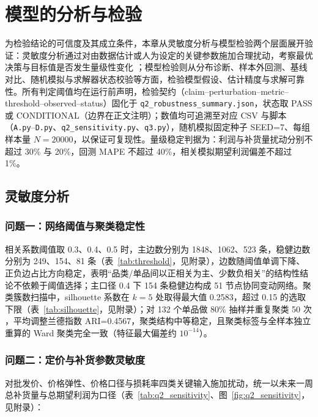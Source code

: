 \section{模型的分析与检验}

为检验结论的可信度及其成立条件，本章从灵敏度分析与模型检验两个层面展开验证：灵敏度分析通过对由数据估计或人为设定的关键参数施加合理扰动，考察最优决策与目标值是否发生量级性变化 \cite{saltelli2008}；模型检验则从分布诊断、样本外回测、基线对比、随机模拟与求解器状态校验等方面，检验模型假设、估计精度与求解可靠性。所有判定阈值均在运行前声明，检验契约（claim--perturbation--metric--threshold--observed--status）固化于 \texttt{q2\_robustness\_summary.json}，状态取 PASS 或 CONDITIONAL（边界在正文注明）；数值均可追溯至对应 CSV 与脚本（\texttt{A.py}--\texttt{D.py}、\texttt{q2\_sensitivity.py}、\texttt{q3.py}），随机模拟固定种子 SEED=7、每组样本量 $N=20000$，以保证可复现性。量级稳定判据为：利润与补货量扰动分别不超过 30\% 与 20\%，回测 MAPE 不超过 40\%，相关模拟期望利润偏差不超过 1\%。

\subsection{灵敏度分析}

\subsubsection{问题一：网络阈值与聚类稳定性}

相关系数阈值取 0.3、0.4、0.5 时，主边数分别为 1848、1062、523 条，稳健边数分别为 249、154、81 条（表~\ref{tab:threshold}，见附录），边数随阈值单调下降、正负边占比方向稳定，表明“品类/单品间以正相关为主、少数负相关”的结构性结论不依赖于阈值选择；主口径 0.4 下 154 条稳健边构成 51 节点协同变动网络。聚类簇数扫描中，silhouette 系数在 $k=5$ 处取得最大值 0.2583，超过 0.15 的选取下限（表~\ref{tab:silhouette}，见附录）；对 132 个单品做 80\% 抽样并重复聚类 50 次 \cite{efron1993}，平均调整兰德指数 ARI=0.4567，聚类结构中等稳定，且聚类标签与全样本独立重算的 Ward 聚类完全一致（特征最大偏差约 $10^{-14}$）。

\subsubsection{问题二：定价与补货参数灵敏度}

对批发价、价格弹性、价格口径与损耗率四类关键输入施加扰动，统一以未来一周总补货量与总期望利润为口径（表~\ref{tab:q2_sensitivity}、图~\ref{fig:q2_sensitivity}，见附录）：

